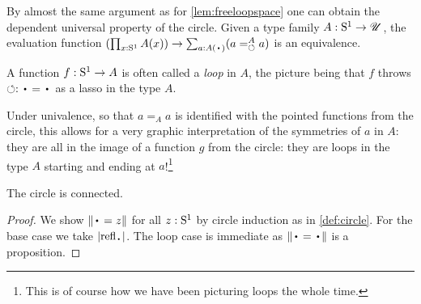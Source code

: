 \begin{remark}\label{rem:dep-univ-prop-circle}
By almost the same argument as for \cref{lem:freeloopspace}
one can obtain the dependent universal property of the circle.
Given a type family $A:{\mathrm{S}^1}\to{\mathscr{U}}$, the evaluation function
$(\prod_{x:\Sc} A(x))\to \sum_{a:A(\base)}(\pathover a A {\Sloop} a)$
is an equivalence.
\end{remark}

\begin{marginfigure}
\end{marginfigure}
\begin{remark}
  A function $f:{\mathrm{S}^1}\to A$ is often called a \emph{loop} in $A$, the
  picture being that $f$ throws $\Sloop:\base=\base$ as a lasso in the
  type $A$.

  Under univalence, so that $a=_Aa$ is identified with the pointed
  functions from the circle, this allows for a very graphic
  interpretation of the symmetries of $a$ in $A$: they are all in the
  image of a function $g$ from the circle: they are loops in the type
  $A$ starting and ending at $a$!\footnote{%
    This is of course how we have been
    picturing loops the whole time.}
\end{remark}

\begin{lemma}\label{lem:circleisconnected}
  The circle is connected.
\end{lemma}
\begin{proof}
We show $\Trunc{\base=z}$ for all $z:{\mathrm{S}^1}$ by circle induction
as in \cref{def:circle}.
For the base case we take $\trunc{\refl{\base}}$.
The loop case is immediate as $\Trunc{\base=\base}$ is a proposition.
\end{proof}

